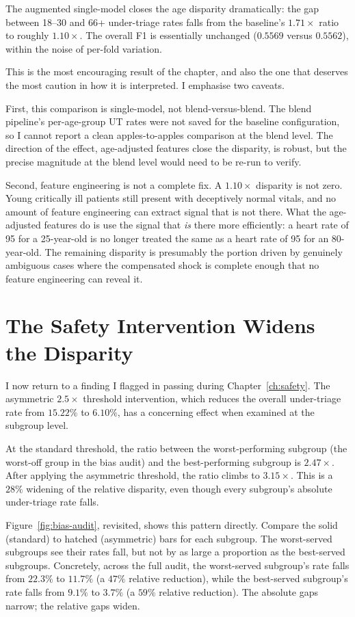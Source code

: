 The augmented single-model closes the age disparity dramatically: the gap between 18--30 and 66+ under-triage rates falls from the baseline's $1.71\times$ ratio to roughly $1.10\times$. The overall F1 is essentially unchanged ($0.5569$ versus $0.5562$), within the noise of per-fold variation.

This is the most encouraging result of the chapter, and also the one that deserves the most caution in how it is interpreted. I emphasise two caveats.

First, this comparison is single-model, not blend-versus-blend. The blend pipeline's per-age-group UT rates were not saved for the baseline configuration, so I cannot report a clean apples-to-apples comparison at the blend level. The direction of the effect, age-adjusted features close the disparity, is robust, but the precise magnitude at the blend level would need to be re-run to verify.

Second, feature engineering is not a complete fix. A $1.10\times$ disparity is not zero. Young critically ill patients still present with deceptively normal vitals, and no amount of feature engineering can extract signal that is not there. What the age-adjusted features do is use the signal that \emph{is} there more efficiently: a heart rate of 95 for a 25-year-old is no longer treated the same as a heart rate of 95 for an 80-year-old. The remaining disparity is presumably the portion driven by genuinely ambiguous cases where the compensated shock is complete enough that no feature engineering can reveal it.

\section{The Safety Intervention Widens the Disparity}

I now return to a finding I flagged in passing during Chapter~\ref{ch:safety}. The asymmetric $2.5\times$ threshold intervention, which reduces the overall under-triage rate from $15.22\%$ to $6.10\%$, has a concerning effect when examined at the subgroup level.

At the standard threshold, the ratio between the worst-performing subgroup (the worst-off group in the bias audit) and the best-performing subgroup is $2.47\times$. After applying the asymmetric threshold, the ratio climbs to $3.15\times$. This is a $28\%$ widening of the relative disparity, even though every subgroup's absolute under-triage rate falls.

Figure~\ref{fig:bias-audit}, revisited, shows this pattern directly. Compare the solid (standard) to hatched (asymmetric) bars for each subgroup. The worst-served subgroups see their rates fall, but not by as large a proportion as the best-served subgroups. Concretely, across the full audit, the worst-served subgroup's rate falls from $22.3\%$ to $11.7\%$ (a $47\%$ relative reduction), while the best-served subgroup's rate falls from $9.1\%$ to $3.7\%$ (a $59\%$ relative reduction). The absolute gaps narrow; the relative gaps widen.

